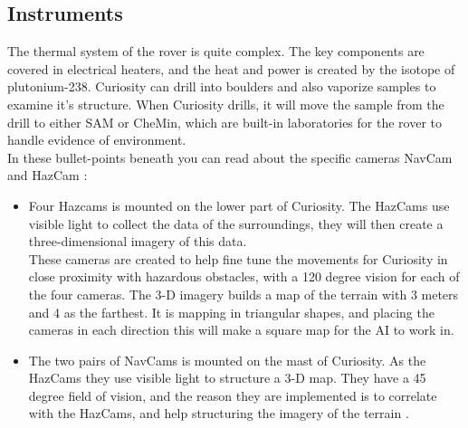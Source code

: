 \subsection{Instruments}
The thermal system of the rover is quite complex. The key components are covered in electrical heaters, and the heat and power is created by the isotope of plutonium-238. Curiosity can drill into boulders and also vaporize samples to examine it's structure. When Curiosity drills, it will move the sample from the drill to either SAM or CheMin, which are built-in laboratories for the rover to handle evidence of environment.\\
In these bullet-points beneath you can read about the specific cameras NavCam and HazCam \cite{CuriosityNASA}\cite{CuriosityPOWER}: 

\begin{itemize}
\item Four Hazcams is mounted on the lower part of Curiosity. The HazCams use visible light to collect the data of the surroundings, they will then create a three-dimensional imagery of this data.\\ These cameras are created to help fine tune the movements for Curiosity in close proximity with hazardous obstacles, with a 120 degree vision for each of the four cameras. The 3-D imagery builds a map of the terrain with 3 meters and 4 as the farthest. It is mapping in triangular shapes, and placing the cameras in each direction this will make a square map for the AI to work in\cite{CuriosityVision}. 
\item The two pairs of NavCams is mounted on the mast of Curiosity. As the HazCams they use visible light to structure a 3-D map. They have a 45 degree field of vision, and the reason they are implemented is to correlate with the HazCams, and help structuring the imagery of the terrain \cite{CuriosityVision}. 
\end{itemize}




